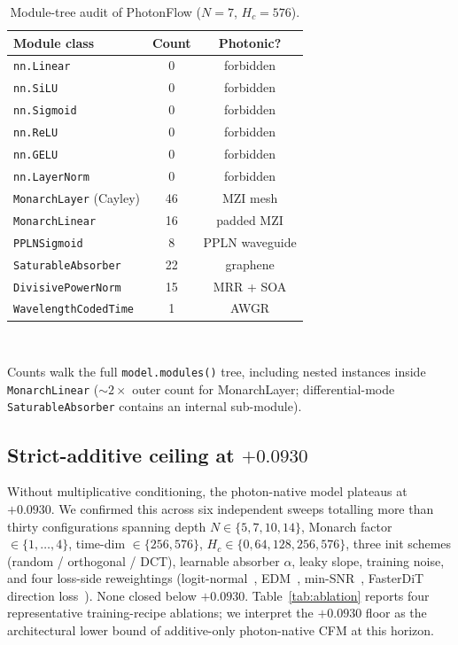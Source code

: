\documentclass[conference]{IEEEtran}
\begin{document}
\begin{table}[tbp]
\caption{Module-tree audit of PhotonFlow ($N{=}7$, $H_c{=}576$).}
\label{tab:audit}
\centering\footnotesize
\setlength{\tabcolsep}{5pt}
\begin{tabular}{@{}lcc@{}}
\toprule
\textbf{Module class} & \textbf{Count} & \textbf{Photonic?}\\
\midrule
\texttt{nn.Linear}                  & 0 & forbidden  \\
\texttt{nn.SiLU}                    & 0 & forbidden  \\
\texttt{nn.Sigmoid}                 & 0 & forbidden  \\
\texttt{nn.ReLU}                    & 0 & forbidden  \\
\texttt{nn.GELU}                    & 0 & forbidden  \\
\texttt{nn.LayerNorm}               & 0 & forbidden  \\
\midrule
\texttt{MonarchLayer} (Cayley)      & 46 & MZI mesh     \\
\texttt{MonarchLinear}              & 16 & padded MZI   \\
\texttt{PPLNSigmoid}                &  8 & PPLN waveguide   \\
\texttt{SaturableAbsorber}          & 22 & graphene         \\
\texttt{DivisivePowerNorm}          & 15 & MRR + SOA        \\
\texttt{WavelengthCodedTime}        &  1 & AWGR             \\
\bottomrule
\end{tabular}\\[2pt]
{\raggedright\scriptsize Counts walk the full \texttt{model.modules()}
tree, including nested instances inside \texttt{MonarchLinear}
(${\sim}\!2\times$ outer count for MonarchLayer; differential-mode
\texttt{SaturableAbsorber} contains an internal sub-module).\par}
\end{table}

\subsection{Strict-additive ceiling at $+0.0930$}
\label{sec:exp-additive}

Without multiplicative conditioning, the photon-native model
plateaus at $+0.0930$.  We confirmed this across six independent
sweeps totalling more than thirty configurations spanning depth
$N\!\in\!\{5,7,10,14\}$, Monarch factor $\in\!\{1,\ldots,4\}$,
time-dim $\in\!\{256,576\}$, $H_c\!\in\!\{0,64,128,256,576\}$,
three init schemes (random / orthogonal / DCT), learnable absorber
$\alpha$, leaky slope, training noise, and four loss-side
reweightings (logit-normal~\cite{esser2024},
EDM~\cite{karras2022edm}, min-SNR~\cite{hang2023minsnr}, FasterDiT
direction loss~\cite{fasterdit2024}).  None closed below $+0.0930$.
Table~\ref{tab:ablation} reports four representative training-recipe
ablations; we interpret the $+0.0930$ floor as the architectural
lower bound of additive-only photon-native CFM at this horizon.
\end{document}
